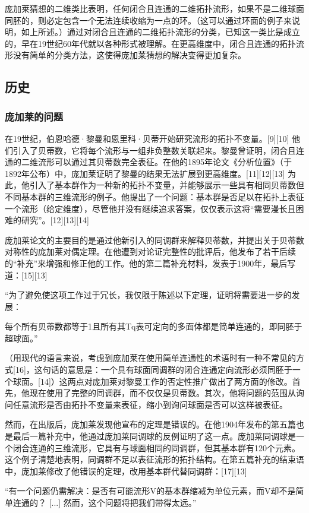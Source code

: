 庞加莱猜想的二维类比表明，任何闭合且连通的二维拓扑流形，如果不是二维球面同胚的，则必定包含一个无法连续收缩为一点的环。（这可以通过环面的例子来说明，如上所述。）通过对闭合且连通的二维拓扑流形的分类，已知这一类比是成立的，早在19世纪60年代就以各种形式被理解。在更高维度中，闭合且连通的拓扑流形没有简单的分类方法，这使得庞加莱猜想的解决变得更加复杂。
\subsection{历史}  
\subsubsection{庞加莱的问题}  
在19世纪，伯恩哈德·黎曼和恩里科·贝蒂开始研究流形的拓扑不变量。[9][10] 他们引入了贝蒂数，它将每个流形与一组非负整数关联起来。黎曼曾证明，闭合且连通的二维流形可以通过其贝蒂数完全表征。在他的1895年论文《分析位置》（于1892年公布）中，庞加莱证明了黎曼的结果无法扩展到更高维度。[11][12][13] 为此，他引入了基本群作为一种新的拓扑不变量，并能够展示一些具有相同贝蒂数但不同基本群的三维流形的例子。他提出了一个问题：基本群是否足以在拓扑上表征一个流形（给定维度），尽管他并没有继续追求答案，仅仅表示这将“需要漫长且困难的研究”。[12][13][14]

庞加莱论文的主要目的是通过他新引入的同调群来解释贝蒂数，并提出关于贝蒂数对称性的庞加莱对偶定理。在他遭到对论证完整性的批评后，他发布了若干后续的“补充”来增强和修正他的工作。他的第二篇补充材料，发表于1900年，最后写道：[15][13]

“为了避免使这项工作过于冗长，我仅限于陈述以下定理，证明将需要进一步的发展：

每个所有贝蒂数都等于1且所有其Tq表可定向的多面体都是简单连通的，即同胚于超球面。”

（用现代的语言来说，考虑到庞加莱在使用简单连通性的术语时有一种不常见的方式[16]，这句话的意思是：一个具有球面同调群的闭合连通定向流形必须同胚于一个球面。[14]）这两点对庞加莱对黎曼工作的否定性推广做出了两方面的修改。首先，他现在使用了完整的同调群，而不仅仅是贝蒂数。其次，他将问题的范围从询问任意流形是否由拓扑不变量来表征，缩小到询问球面是否可以这样被表征。

然而，在出版后，庞加莱发现他宣布的定理是错误的。在他1904年发布的第五篇也是最后一篇补充中，他通过庞加莱同调球的反例证明了这一点。庞加莱同调球是一个闭合连通的三维流形，它具有与球面相同的同调群，但其基本群有120个元素。这个例子清楚地表明，同调群不足以表征流形的拓扑结构。在第五篇补充的结束语中，庞加莱修改了他错误的定理，改用基本群代替同调群：[17][13]

“有一个问题仍需解决：是否有可能流形V的基本群缩减为单位元素，而V却不是简单连通的？ [...] 然而，这个问题将把我们带得太远。”


